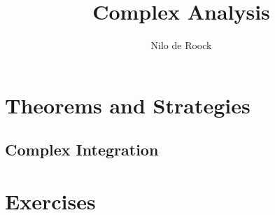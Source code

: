 \documentclass[a4paper,10pt,oneside]{book}
\title{Complex Analysis}
\author{Nilo de Roock}
\date{\Date}
\begin{document}
    \maketitle
    \tableofcontents{}
    \newpage
    \thispagestyle{empty}


    \chapter{Theorems and Strategies}
    \section{Complex Integration}

    


    \chapter{Exercises}





\end{document}
